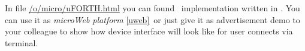 \clearpage{}\secdown

In file
\href{https://github.com/ponyatov/o/raw/master/micro/uFORTH.html}{/o/micro/uFORTH.html}
you can found \uF\ implementation written in \js. You can use it as \emph{microWeb platform} \ref{uweb}\ or just give it as advertisement demo to your colleague to show how device interface will look like for user
connects via terminal.

\secup